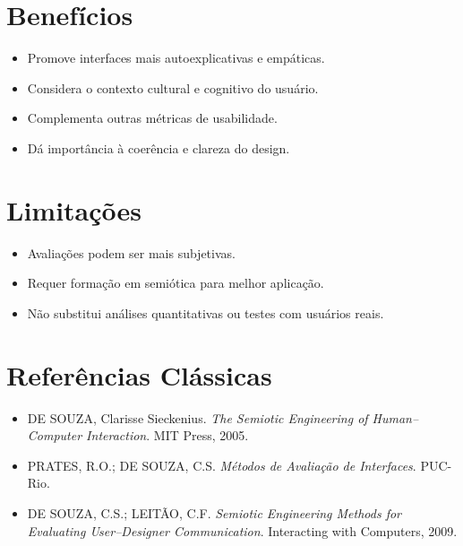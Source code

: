 \documentclass[12pt,a4paper]{article}
\begin{document}
\section{Benefícios}
\begin{itemize}
    \item Promove interfaces mais autoexplicativas e empáticas.
    \item Considera o contexto cultural e cognitivo do usuário.
    \item Complementa outras métricas de usabilidade.
    \item Dá importância à coerência e clareza do design.
\end{itemize}

\section{Limitações}
\begin{itemize}
    \item Avaliações podem ser mais subjetivas.
    \item Requer formação em semiótica para melhor aplicação.
    \item Não substitui análises quantitativas ou testes com usuários reais.
\end{itemize}

\section{Referências Clássicas}
\begin{itemize}
    \item DE SOUZA, Clarisse Sieckenius. \textit{The Semiotic Engineering of Human–Computer Interaction}. MIT Press, 2005.
    \item PRATES, R.O.; DE SOUZA, C.S. \textit{Métodos de Avaliação de Interfaces}. PUC-Rio.
    \item DE SOUZA, C.S.; LEITÃO, C.F. \textit{Semiotic Engineering Methods for Evaluating User–Designer Communication}. Interacting with Computers, 2009.
\end{itemize}
\end{document}
